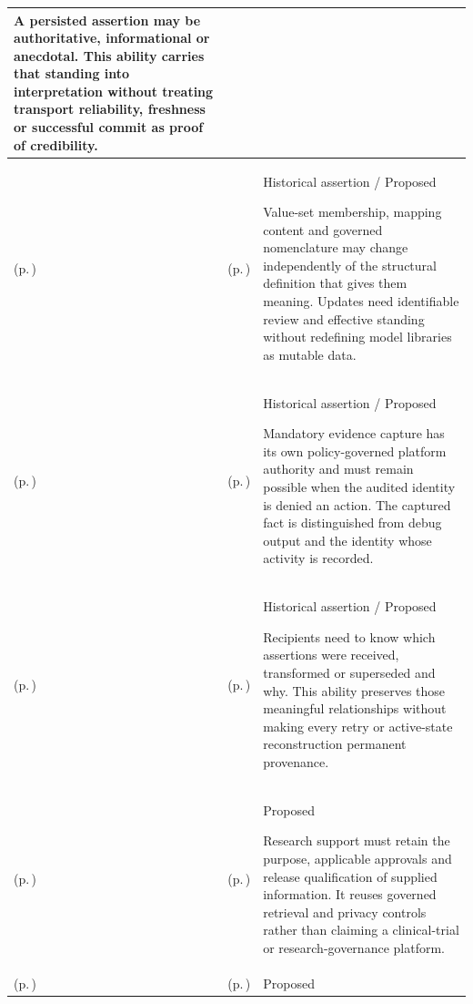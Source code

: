 \begin{longtable}{|>{\raggedright\arraybackslash}p{0.27\TableWidth}|>{\raggedright\arraybackslash}p{0.27\TableWidth}|>{\raggedright\arraybackslash}p{0.46\TableWidth}|}
A persisted assertion may be authoritative, informational or anecdotal. This ability carries that standing into interpretation without treating transport reliability, freshness or successful commit as proof of credibility.\\\hline
\nameref{cap:bec-semantic-reference-knowledge-enablement} (p.\,\pageref{cap:bec-semantic-reference-knowledge-enablement}) & \nameref{cap:bec-governed-reference-dataset-administration} (p.\,\pageref{cap:bec-governed-reference-dataset-administration}) & Historical assertion / Proposed

Value-set membership, mapping content and governed nomenclature may change independently of the structural definition that gives them meaning. Updates need identifiable review and effective standing without redefining model libraries as mutable data.\\\hline
\nameref{cap:bec-information-protection-accountability-enablement} (p.\,\pageref{cap:bec-information-protection-accountability-enablement}) & \nameref{cap:bec-significant-activity-audit-capture} (p.\,\pageref{cap:bec-significant-activity-audit-capture}) & Historical assertion / Proposed

Mandatory evidence capture has its own policy-governed platform authority and must remain possible when the audited identity is denied an action. The captured fact is distinguished from debug output and the identity whose activity is recorded.\\\hline
\nameref{cap:bec-information-protection-accountability-enablement} (p.\,\pageref{cap:bec-information-protection-accountability-enablement}) & \nameref{cap:bec-information-lineage-stewardship} (p.\,\pageref{cap:bec-information-lineage-stewardship}) & Historical assertion / Proposed

Recipients need to know which assertions were received, transformed or superseded and why. This ability preserves those meaningful relationships without making every retry or active-state reconstruction permanent provenance.\\\hline
\nameref{cap:bec-secondary-health-information-use-enablement} (p.\,\pageref{cap:bec-secondary-health-information-use-enablement}) & \nameref{cap:bec-authorised-research-information-provision} (p.\,\pageref{cap:bec-authorised-research-information-provision}) & Proposed

Research support must retain the purpose, applicable approvals and release qualification of supplied information. It reuses governed retrieval and privacy controls rather than claiming a clinical-trial or research-governance platform.\\\hline
\nameref{cap:bec-secondary-health-information-use-enablement} (p.\,\pageref{cap:bec-secondary-health-information-use-enablement}) & \nameref{cap:bec-population-health-notification-enablement} (p.\,\pageref{cap:bec-population-health-notification-enablement}) & Proposed


\end{longtable}
